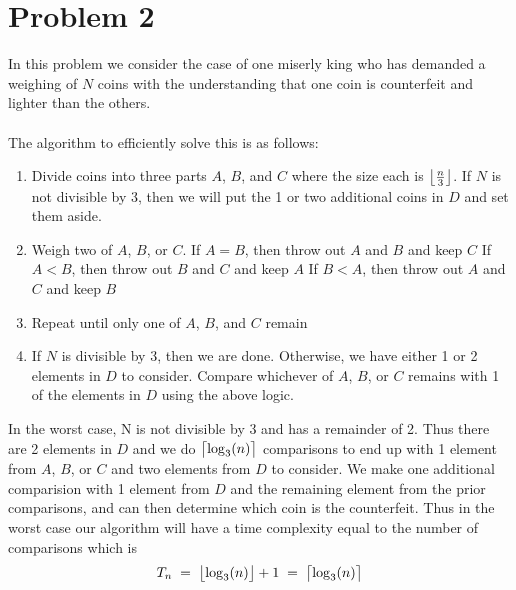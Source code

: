 \section*{Problem 2}

In this problem we consider the case of one miserly king who has 
demanded a weighing of $N$ coins with the understanding that one coin
is counterfeit and lighter than the others. 
\\
\\
The algorithm to efficiently solve this is as follows:
\begin{enumerate}[itemsep=0.25em]
    \item Divide coins into three parts $A$, $B$, and $C$ where the size
          each is $\floor[\big]{\frac{n}{3}}$. If $N$ is not divisible
          by 3, then we will put the 1 or two additional coins in $D$
          and set them aside.
    \item Weigh two of $A$, $B$, or $C$.
    \subitem If $A = B$,  then throw out $A$ and $B$ and keep $C$
    \subitem If $A < B$, then throw out $B$ and $C$ and keep $A$
    \subitem If $B < A$, then throw out $A$ and $C$ and keep $B$
    \item Repeat until only one of $A$, $B$, and $C$ remain
    \item If $N$ is divisible by 3, then we are done. Otherwise, we
          have either 1 or 2 elements in $D$ to consider. Compare 
          whichever of $A$, $B$, or $C$ remains with 1 of the elements
          in $D$ using the above logic.
\end{enumerate} 
%
In the worst case, N is not divisible by 3 and has a remainder of 2. 
Thus there are 2 elements in $D$ and we do $\ceil[\big]{\log_3(n)}$ 
comparisons to end up with 1 element from $A$, $B$, or $C$ and two 
elements from $D$ to consider. We make one additional comparision with 
1 element from $D$ and the remaining element from the prior comparisons,
and can then determine which coin is the counterfeit. Thus in the worst
case our algorithm will have a time complexity equal to the number of
comparisons which is
$$
    T_n \; = \; \floor[\big]{\log_3(n)} + 1 \; = \; 
    \ceil[\big]{\log_3(n)} 
$$
